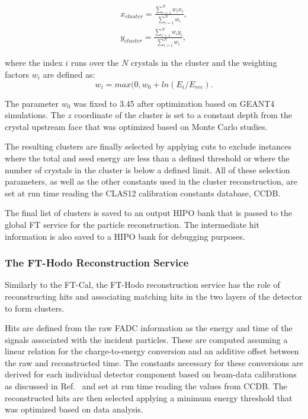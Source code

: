 \begin{eqnarray*}
x_{cluster} = \frac{\sum_{i=1}^N w_i x_i}{\sum_{i=1}^N w_i},\\
y_{cluster} = \frac{\sum_{i=1}^N w_i y_i}{\sum_{i=1}^N w_i},
\end{eqnarray*}

\noindent
where the index $i$ runs over the $N$ crystals in the cluster and the weighting factors $w_i$ are defined as:
\begin{equation}
w_i=max(0,w_0+ln(E_i/E_{rec}).
\end{equation}

The parameter $w_0$ was fixed to 3.45 after optimization based on GEANT4 simulations. The $z$ coordinate of
the cluster is set to a constant depth from the crystal upstream face that was optimized based on Monte Carlo
studies.

The resulting clusters are finally selected by applying cuts to exclude instances where the total and seed energy
are less than a defined threshold or where the number of crystals in the cluster is below a defined limit. All of these
selection parameters, as well as the other constants used in the cluster reconstruction, are set at run time reading
the CLAS12 calibration constants database, CCDB.

The final list of clusters is saved to an output HIPO bank that is passed to the global FT service for the particle
reconstruction. The intermediate hit information is also saved to a HIPO bank for debugging purposes.

\subsubsection{The FT-Hodo Reconstruction Service}

Similarly to the FT-Cal, the FT-Hodo reconstruction service has the role of reconstructing hits and associating
matching hits in the two layers of the detector to form clusters. 

Hits are defined from the raw FADC information as the energy and time of the signals associated with the incident
particles. These are computed assuming a linear relation for the charge-to-energy conversion and an additive
offset between the raw and reconstructed time. The constants necessary for these conversions are derived
for each individual detector component based on beam-data calibrations as discussed in Ref.~\cite{ft-nim} and set
at run time reading the values from CCDB. The reconstructed hits are then selected applying a minimum energy
threshold that was optimized based on data analysis.


